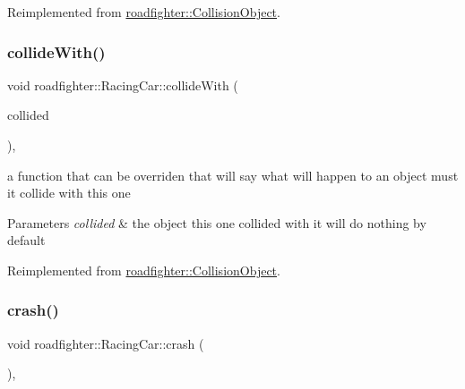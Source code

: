 Reimplemented from \hyperlink{classroadfighter_1_1CollisionObject_ad35887bb3cfb8c054eaaee56306d6944}{roadfighter\+::\+Collision\+Object}.

\mbox{\label{classroadfighter_1_1RacingCar_a1de00cf7c8df548e8ab57a27cefb7345}} 
\subsubsection{\texorpdfstring{collide\+With()}{collideWith()}}
{\footnotesize\ttfamily void roadfighter\+::\+Racing\+Car\+::collide\+With (\begin{DoxyParamCaption}\item[{std\+::shared\+\_\+ptr$<$ \hyperlink{classroadfighter_1_1CollisionObject}{Collision\+Object} $>$ \&}]{collided }\end{DoxyParamCaption})\hspace{0.3cm}{\ttfamily [override]}, {\ttfamily [virtual]}}

a function that can be overriden that will say what will happen to an object must it collide with this one 
\begin{DoxyParams}{Parameters}
{\em collided} & the object this one collided with it will do nothing by default \\
\hline
\end{DoxyParams}


Reimplemented from \hyperlink{classroadfighter_1_1CollisionObject_a9eba85551432f548f2a0c20217a60f42}{roadfighter\+::\+Collision\+Object}.

\mbox{\label{classroadfighter_1_1RacingCar_a2f5018f17852d75682afd78e806b8e4c}} 
\subsubsection{\texorpdfstring{crash()}{crash()}}
{\footnotesize\ttfamily void roadfighter\+::\+Racing\+Car\+::crash (\begin{DoxyParamCaption}{ }\end{DoxyParamCaption})\hspace{0.3cm}{\ttfamily [override]}, {\ttfamily [virtual]}}

